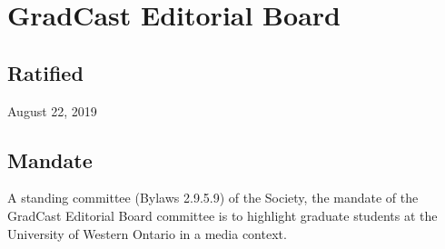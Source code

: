 \section{GradCast Editorial Board}

\subsection{Ratified}
August 22, 2019

\subsection{Mandate}
A standing committee (Bylaws 2.9.5.9) of the Society, the mandate of the GradCast Editorial Board committee is to highlight graduate students at the University of Western Ontario in a media context.

